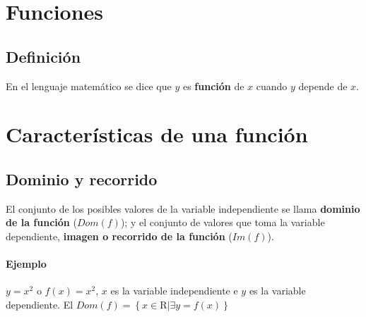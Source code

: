 %
%
%
%
%
%
%
%
%
%
%
%


\section{Funciones}

\subsection{Definición}

En el lenguaje matemático se dice que $y$ es \textbf{función} de $x$ cuando $y$ depende de $x$.

\section{Características de una función}

\subsection{Dominio y recorrido}
El conjunto de los posibles valores de la
variable independiente se llama \textbf{dominio de la función} ($Dom(f)$); y el conjunto de valores que toma la variable dependiente, \textbf{imagen o recorrido de la función} ($Im(f)$).

\paragraph{Ejemplo}
$y=x^2$ o $f(x)=x^2$, $x$ es la variable independiente e $y$ es la variable dependiente. El $Dom(f)=\left\lbrace x \in \mathrm{R} | \exists y=f(x)\right\rbrace$ 	

